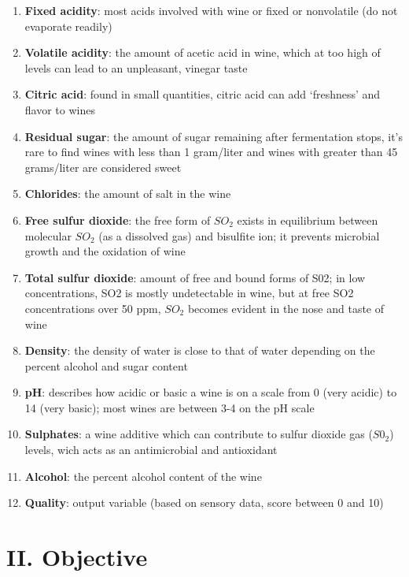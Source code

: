 \documentclass{article}
\providecommand{\tightlist}{%
      \setlength{\itemsep}{0pt}\setlength{\parskip}{0pt}}
\begin{document}
\begin{enumerate}
\def\labelenumi{\arabic{enumi}.}
\tightlist
\item
  \textbf{Fixed acidity}: most acids involved with wine or fixed or
  nonvolatile (do not evaporate readily)
\item
  \textbf{Volatile acidity}: the amount of acetic acid in wine, which at
  too high of levels can lead to an unpleasant, vinegar taste
\item
  \textbf{Citric acid}: found in small quantities, citric acid can add
  `freshness' and flavor to wines
\item
  \textbf{Residual sugar}: the amount of sugar remaining after
  fermentation stops, it's rare to find wines with less than 1
  gram/liter and wines with greater than 45 grams/liter are considered
  sweet
\item
  \textbf{Chlorides}: the amount of salt in the wine
\item
  \textbf{Free sulfur dioxide}: the free form of \(SO_{2}\) exists in
  equilibrium between molecular \(SO_{2}\) (as a dissolved gas) and
  bisulfite ion; it prevents microbial growth and the oxidation of wine
\item
  \textbf{Total sulfur dioxide}: amount of free and bound forms of S02;
  in low concentrations, SO2 is mostly undetectable in wine, but at free
  SO2 concentrations over 50 ppm, \(SO_{2}\) becomes evident in the nose
  and taste of wine
\item
  \textbf{Density}: the density of water is close to that of water
  depending on the percent alcohol and sugar content
\item
  \textbf{pH}: describes how acidic or basic a wine is on a scale from 0
  (very acidic) to 14 (very basic); most wines are between 3-4 on the pH
  scale
\item
  \textbf{Sulphates}: a wine additive which can contribute to sulfur
  dioxide gas (\(S0_{2}\)) levels, wich acts as an antimicrobial and
  antioxidant
\item
  \textbf{Alcohol}: the percent alcohol content of the wine
\item
  \textbf{Quality}: output variable (based on sensory data, score
  between 0 and 10)
\end{enumerate}

\section*{II. Objective}\label{ii.-objective}
\end{document}

